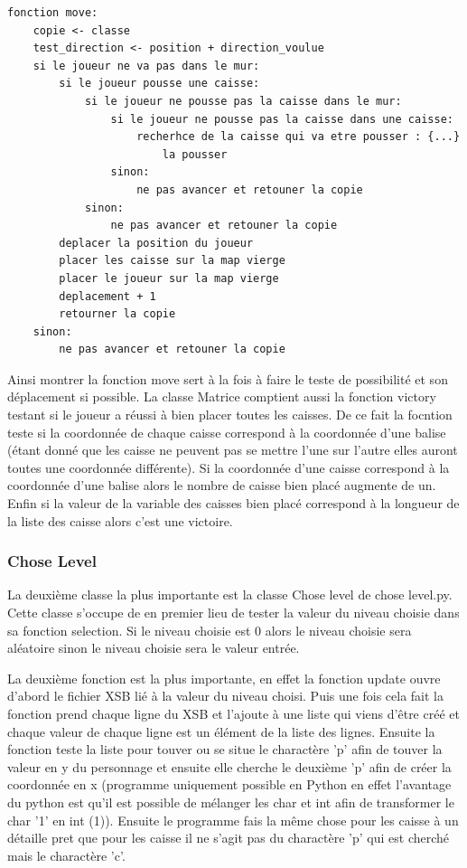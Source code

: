 \documentclass[a4paper,12pt]{article} %
\begin{document}
\begin{lstlisting}
fonction move:
    copie <- classe
    test_direction <- position + direction_voulue
    si le joueur ne va pas dans le mur:
        si le joueur pousse une caisse:
            si le joueur ne pousse pas la caisse dans le mur:
                si le joueur ne pousse pas la caisse dans une caisse:
                    recherhce de la caisse qui va etre pousser : {...}
                        la pousser
                sinon:
                    ne pas avancer et retouner la copie
            sinon:
                ne pas avancer et retouner la copie
        deplacer la position du joueur
        placer les caisse sur la map vierge
        placer le joueur sur la map vierge
        deplacement + 1
        retourner la copie
    sinon:
        ne pas avancer et retouner la copie
\end{lstlisting}

Ainsi montrer la fonction move sert à la fois à faire le teste de possibilité et son déplacement si possible.
La classe Matrice comptient aussi la fonction victory testant si le joueur a réussi à bien placer toutes les caisses.
De ce fait la focntion teste si la coordonnée de chaque caisse correspond à la coordonnée d'une balise (étant donné que les caisse ne peuvent pas se mettre l'une sur l'autre elles auront toutes une coordonnée différente).
Si la coordonnée d'une caisse correspond à la coordonnée d'une balise alors le nombre de caisse bien placé augmente de un.
Enfin si la valeur de la variable des caisses bien placé correspond à la longueur de la liste des caisse alors c'est une victoire.

\subsubsection{Chose Level}

La deuxième classe la plus importante est la classe Chose level de chose level.py.
Cette classe s'occupe de en premier lieu de tester la valeur du niveau choisie dans sa fonction selection.
Si le niveau choisie est 0 alors le niveau choisie sera aléatoire sinon le niveau choisie sera le valeur entrée.

La deuxième fonction est la plus importante, en effet la fonction update ouvre d'abord le fichier XSB lié à la valeur du niveau choisi.
Puis une fois cela fait la fonction prend chaque ligne du XSB et l'ajoute à une liste qui viens d'être créé et chaque valeur de chaque ligne est un élément de la liste des lignes.
Ensuite la fonction teste la liste pour touver ou se situe le charactère 'p' afin de touver la valeur en y du personnage et ensuite elle cherche le deuxième 'p' afin de créer la coordonnée en x (programme uniquement possible en Python en effet l'avantage du python est qu'il est possible de mélanger les char et int afin de transformer le char '1' en int (1)).
Ensuite le programme fais la même chose pour les caisse à un détaille pret que pour les caisse il ne s'agit pas du charactère 'p' qui est cherché mais le charactère 'c'. 
\end{document}
